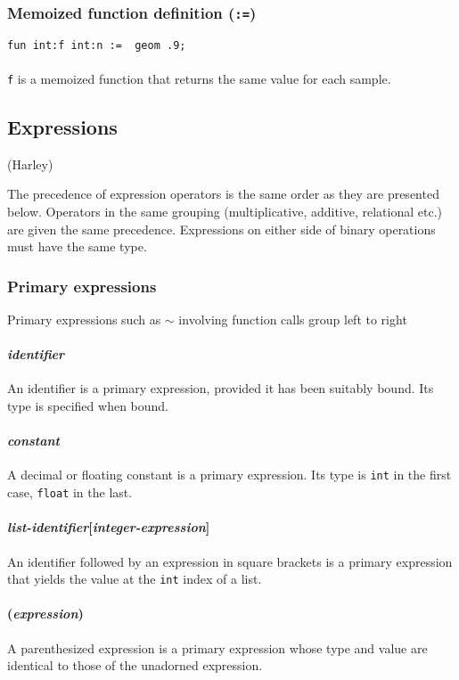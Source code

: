 \subsubsection{Memoized function definition (\texttt{:=})}
\texttt{fun int:f int:n := ~geom .9;}\\
\\
\texttt{f} is a memoized function that returns the same value for each sample.

\subsection{Expressions}
(Harley)

The precedence of expression operators is the same order as they are presented below. Operators in the same grouping (multiplicative, additive, relational etc.) are given the same precedence. Expressions on either side of binary operations must have the same type. 

\subsubsection{Primary expressions}
Primary expressions such as $\sim$ involving function calls group left to right

\paragraph{\textit{identifier}}
An identifier is a primary expression, provided it has been suitably bound. Its type is specified when bound. 

\paragraph{\textit{constant}}
A decimal or floating constant is a primary expression. Its type is \texttt{int} in the first case, \texttt{float} in the last. 

\paragraph{\textit{list-identifier}[\textit{integer-expression}]}
An identifier followed by an expression in square brackets is a primary expression that yields the value at the \texttt{int}  index of a list.

\paragraph{(\textit{expression})}
A parenthesized expression is a primary expression whose type and value are identical to those of the unadorned expression. 



